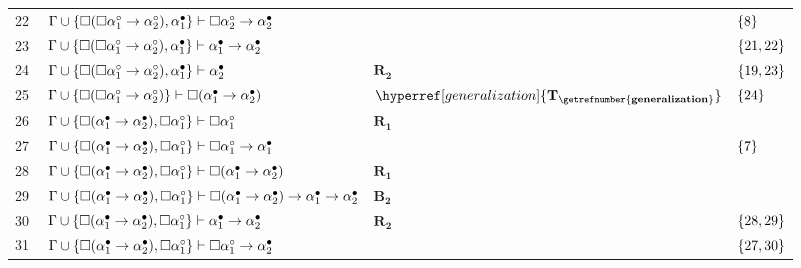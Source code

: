 \begin{tcolorbox}[enhanced jigsaw, breakable, sharp corners, colframe=black, colback=white, boxrule=0.5pt, left=1.5mm, right=1.5mm, top=1.5mm, bottom=1.5mm]
\begin{xltabular}{\textwidth}{r | X l l}
            \scriptsize{22}\phantom{ } & $\ \Gamma \cup \left\{\Box(\Box\alpha_1^\circ \to \alpha_2^\circ), \alpha_1^\bullet\right\} \vdash \Box\alpha_2^\circ \to \alpha_2^\bullet$ &  & $\left\{8\right\}$\\[\rowskip]
            \scriptsize{23}\phantom{ } & $\ \Gamma \cup \left\{\Box(\Box\alpha_1^\circ \to \alpha_2^\circ), \alpha_1^\bullet\right\} \vdash \alpha_1^\bullet \to \alpha_2^\bullet$ &  & $\left\{21,22\right\}$\\[\rowskip]
            \scriptsize{24}\phantom{ } & $\ \Gamma \cup \left\{\Box(\Box\alpha_1^\circ \to \alpha_2^\circ), \alpha_1^\bullet\right\} \vdash \alpha_2^\bullet$ & $\hyperref[modal.rule.2]{\mathbf{R_2}}$ & $\left\{19,23\right\}$\\[\rowskip]
            \scriptsize{25}\phantom{ } & $\ \Gamma \cup \left\{\Box(\Box\alpha_1^\circ \to \alpha_2^\circ)\right\} \vdash \Box(\alpha_1^\bullet \to \alpha_2^\bullet)$ & $\hyperref[generalization]{\mathbf{T_{\getrefnumber{generalization}}}}$ & $\left\{24\right\}$\\[\rowskip]
            \scriptsize{26}\phantom{ } & $\ \Gamma \cup \left\{\Box(\alpha_1^\bullet \to \alpha_2^\bullet), \Box\alpha_1^\circ\right\} \vdash \Box\alpha_1^\circ$ & $\hyperref[modal.rule.1]{\mathbf{R_1}}$ & \\[\rowskip]
            \scriptsize{27}\phantom{ } & $\ \Gamma \cup \left\{\Box(\alpha_1^\bullet \to \alpha_2^\bullet), \Box\alpha_1^\circ\right\} \vdash \Box\alpha_1^\circ \to \alpha_1^\bullet$ &  & $\left\{7\right\}$\\[\rowskip]
            \scriptsize{28}\phantom{ } & $\ \Gamma \cup \left\{\Box(\alpha_1^\bullet \to \alpha_2^\bullet), \Box\alpha_1^\circ\right\} \vdash \Box(\alpha_1^\bullet \to \alpha_2^\bullet)$ & $\hyperref[modal.rule.1]{\mathbf{R_1}}$ & \\[\rowskip]
            \scriptsize{29}\phantom{ } & $\ \Gamma \cup \left\{\Box(\alpha_1^\bullet \to \alpha_2^\bullet), \Box\alpha_1^\circ\right\} \vdash \Box(\alpha_1^\bullet \to \alpha_2^\bullet) \to \alpha_1^\bullet \to \alpha_2^\bullet$ & $\hyperref[modal.axiom.modal.2]{\mathbf{B_2}}$ & \\[\rowskip]
            \scriptsize{30}\phantom{ } & $\ \Gamma \cup \left\{\Box(\alpha_1^\bullet \to \alpha_2^\bullet), \Box\alpha_1^\circ\right\} \vdash \alpha_1^\bullet \to \alpha_2^\bullet$ & $\hyperref[modal.rule.2]{\mathbf{R_2}}$ & $\left\{28,29\right\}$\\[\rowskip]
            \scriptsize{31}\phantom{ } & $\ \Gamma \cup \left\{\Box(\alpha_1^\bullet \to \alpha_2^\bullet), \Box\alpha_1^\circ\right\} \vdash \Box\alpha_1^\circ \to \alpha_2^\bullet$ &  & $\left\{27,30\right\}$\\[\rowskip]

\end{xltabular}
\end{tcolorbox}
